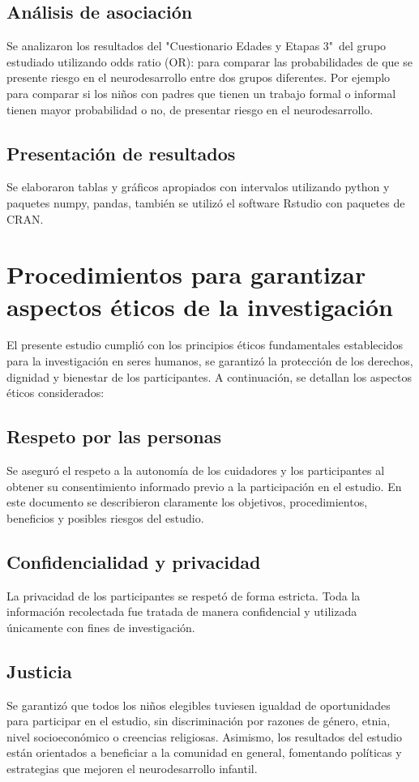 \documentclass[11pt,letterpaper]{report}
\newcommand{\asq}{"Cuestionario Edades y Etapas 3"}
\begin{document}
\subsection{Análisis de asociación}
Se analizaron los resultados del \asq\ del grupo estudiado utilizando odds
ratio (OR): para comparar las probabilidades de que se presente riesgo en el
neurodesarrollo entre dos grupos diferentes. Por ejemplo para comparar si los
niños con padres que tienen un trabajo formal o informal tienen mayor
probabilidad o no, de presentar riesgo en el neurodesarrollo.

\subsection{Presentación de resultados}
Se elaboraron tablas y gráficos apropiados con intervalos utilizando
python y paquetes numpy, pandas, también se utilizó el software
Rstudio con paquetes de CRAN.

\section{Procedimientos para garantizar aspectos éticos de la investigación}
El presente estudio cumplió con los principios éticos fundamentales establecidos
para la investigación en seres humanos, se garantizó la protección de los
derechos, dignidad y bienestar de los participantes. A continuación, se
detallan los aspectos éticos considerados:

\subsection{Respeto por las personas}
Se aseguró el respeto a la autonomía de los cuidadores y los participantes al
obtener su consentimiento informado previo a la participación en el estudio.
En este documento se describieron claramente los objetivos, procedimientos,
beneficios y posibles riesgos del estudio.

\subsection{Confidencialidad y privacidad}
La privacidad de los participantes se respetó de forma estricta. Toda la
información recolectada fue tratada de manera confidencial y utilizada
únicamente con fines de investigación.

\subsection{Justicia}
Se garantizó que todos los niños elegibles tuviesen igualdad de oportunidades
para participar en el estudio, sin discriminación por razones de género, etnia,
nivel socioeconómico o creencias religiosas. Asimismo, los resultados del
estudio están orientados a beneficiar a la comunidad en general, fomentando
políticas y estrategias que mejoren el neurodesarrollo infantil.
\end{document}
